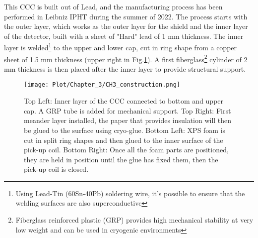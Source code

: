 \documentclass[12pt,a4paper]{report}
\begin{document}
       This CCC is built out of Lead, and the manufacturing process has been performed in Leibniz IPHT during the summer of 2022. The process starts with the outer layer, which works as the outer layer for the shield and the inner layer of the detector, built with a sheet of "Hard" lead of 1 mm thickness. The inner layer is welded\footnote{Using Lead-Tin (60Sn-40Pb) soldering wire, it's possible to ensure that the welding surfaces are also superconductive} to the upper and lower cap, cut in ring shape from a copper sheet of 1.5 mm thickness (upper right in Fig.\ref{CH3_ax_construction}). A first fiberglass\footnote{Fiberglass reinforced plastic (GRP) provides high mechanical stability at very low weight and can be used in cryogenic environments} cylinder of 2 mm thickness is then placed after the inner layer to provide structural support.
       
       \begin{figure}[H]
       	\centering
       	\texttt{[image: Plot/Chapter\_3/CH3\_construction.png]}
       	\caption{\small{Top Left: Inner layer of the CCC connected to bottom and upper cap. A GRP tube is added for mechanical support. Top Right: First meander layer installed, the paper that provides insulation will then be glued to the surface using cryo-glue. Bottom Left: XPS foam is cut in split ring shapes and then glued to the inner surface of the pick-up coil. Bottom Right: Once all the foam parts are positioned, they are held in position until the glue has fixed them, then the pick-up coil is closed.}}
       	\label{CH3_ax_construction}
       \end{figure}
       
\end{document}
